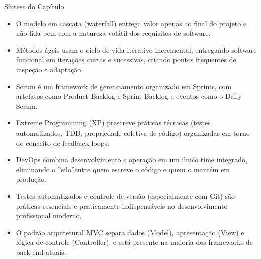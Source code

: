 Síntese do Capítulo

\begin{itemize}
  \item O modelo em cascata (waterfall) entrega valor apenas ao final do projeto e não lida bem com a natureza volátil dos requisitos de software.
\end{itemize}

\begin{itemize}
  \item Métodos ágeis usam o ciclo de vida iterativo-incremental, entregando software funcional em iterações curtas e sucessivas, criando pontos frequentes de inspeção e adaptação.
\end{itemize}

\begin{itemize}
  \item Scrum é um framework de gerenciamento organizado em Sprints, com artefatos como Product Backlog e Sprint Backlog e eventos como o Daily Scrum.
\end{itemize}

\begin{itemize}
  \item Extreme Programming (XP) prescreve práticas técnicas (testes automatizados, TDD, propriedade coletiva de código) organizadas em torno do conceito de feedback loops.
\end{itemize}

\begin{itemize}
  \item DevOps combina desenvolvimento e operação em um único time integrado, eliminando o ”silo”entre quem escreve o código e quem o mantém em produção.
\end{itemize}

\begin{itemize}
  \item Testes automatizados e controle de versão (especialmente com Git) são práticas essenciais e praticamente indispensáveis no desenvolvimento profissional moderno.
\end{itemize}

\begin{itemize}
  \item O padrão arquitetural MVC separa dados (Model), apresentação (View) e lógica de controle (Controller), e está presente na maioria dos frameworks de back-end atuais.
\end{itemize}
